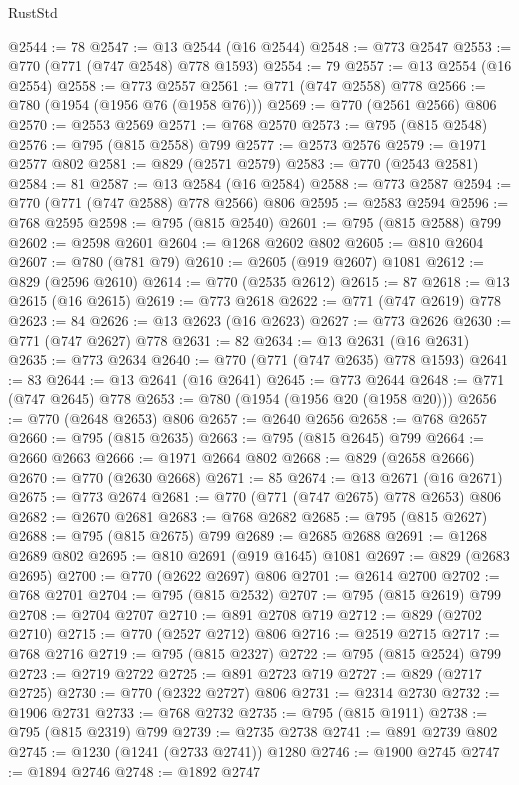 \begin{lexlean}{RustStd}
\begin{coremodule}
@2544 := 78
@2547 := @13 @2544 (@16 @2544)
@2548 := @773 @2547
@2553 := @770 (@771 (@747 @2548) @778 @1593)
@2554 := 79
@2557 := @13 @2554 (@16 @2554)
@2558 := @773 @2557
@2561 := @771 (@747 @2558) @778
@2566 := @780 (@1954 (@1956 @76 (@1958 @76)))
@2569 := @770 (@2561 @2566) @806
@2570 := @2553 @2569
@2571 := @768 @2570
@2573 := @795 (@815 @2548)
@2576 := @795 (@815 @2558) @799
@2577 := @2573 @2576
@2579 := @1971 @2577 @802
@2581 := @829 (@2571 @2579)
@2583 := @770 (@2543 @2581)
@2584 := 81
@2587 := @13 @2584 (@16 @2584)
@2588 := @773 @2587
@2594 := @770 (@771 (@747 @2588) @778 @2566) @806
@2595 := @2583 @2594
@2596 := @768 @2595
@2598 := @795 (@815 @2540)
@2601 := @795 (@815 @2588) @799
@2602 := @2598 @2601
@2604 := @1268 @2602 @802
@2605 := @810 @2604
@2607 := @780 (@781 @79)
@2610 := @2605 (@919 @2607) @1081
@2612 := @829 (@2596 @2610)
@2614 := @770 (@2535 @2612)
@2615 := 87
@2618 := @13 @2615 (@16 @2615)
@2619 := @773 @2618
@2622 := @771 (@747 @2619) @778
@2623 := 84
@2626 := @13 @2623 (@16 @2623)
@2627 := @773 @2626
@2630 := @771 (@747 @2627) @778
@2631 := 82
@2634 := @13 @2631 (@16 @2631)
@2635 := @773 @2634
@2640 := @770 (@771 (@747 @2635) @778 @1593)
@2641 := 83
@2644 := @13 @2641 (@16 @2641)
@2645 := @773 @2644
@2648 := @771 (@747 @2645) @778
@2653 := @780 (@1954 (@1956 @20 (@1958 @20)))
@2656 := @770 (@2648 @2653) @806
@2657 := @2640 @2656
@2658 := @768 @2657
@2660 := @795 (@815 @2635)
@2663 := @795 (@815 @2645) @799
@2664 := @2660 @2663
@2666 := @1971 @2664 @802
@2668 := @829 (@2658 @2666)
@2670 := @770 (@2630 @2668)
@2671 := 85
@2674 := @13 @2671 (@16 @2671)
@2675 := @773 @2674
@2681 := @770 (@771 (@747 @2675) @778 @2653) @806
@2682 := @2670 @2681
@2683 := @768 @2682
@2685 := @795 (@815 @2627)
@2688 := @795 (@815 @2675) @799
@2689 := @2685 @2688
@2691 := @1268 @2689 @802
@2695 := @810 @2691 (@919 @1645) @1081
@2697 := @829 (@2683 @2695)
@2700 := @770 (@2622 @2697) @806
@2701 := @2614 @2700
@2702 := @768 @2701
@2704 := @795 (@815 @2532)
@2707 := @795 (@815 @2619) @799
@2708 := @2704 @2707
@2710 := @891 @2708 @719
@2712 := @829 (@2702 @2710)
@2715 := @770 (@2527 @2712) @806
@2716 := @2519 @2715
@2717 := @768 @2716
@2719 := @795 (@815 @2327)
@2722 := @795 (@815 @2524) @799
@2723 := @2719 @2722
@2725 := @891 @2723 @719
@2727 := @829 (@2717 @2725)
@2730 := @770 (@2322 @2727) @806
@2731 := @2314 @2730
@2732 := @1906 @2731
@2733 := @768 @2732
@2735 := @795 (@815 @1911)
@2738 := @795 (@815 @2319) @799
@2739 := @2735 @2738
@2741 := @891 @2739 @802
@2745 := @1230 (@1241 (@2733 @2741)) @1280
@2746 := @1900 @2745
@2747 := @1894 @2746
@2748 := @1892 @2747

\end{coremodule}
\end{lexlean}
